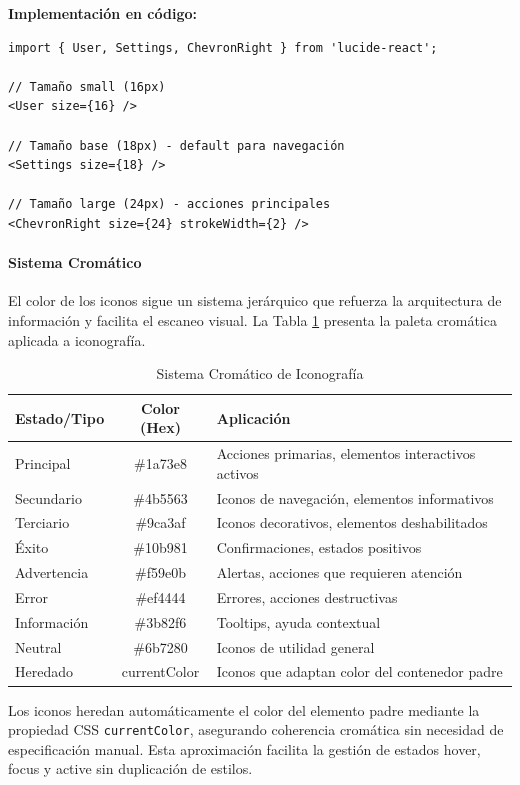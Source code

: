 \documentclass[12pt,a4paper,oneside]{article}
\begin{document}
\textbf{Implementación en código:}

\begin{verbatim}
import { User, Settings, ChevronRight } from 'lucide-react';

// Tamaño small (16px)
<User size={16} />

// Tamaño base (18px) - default para navegación
<Settings size={18} />

// Tamaño large (24px) - acciones principales
<ChevronRight size={24} strokeWidth={2} />
\end{verbatim}

\paragraph{Sistema Cromático}
El color de los iconos sigue un sistema jerárquico que refuerza la arquitectura de información y facilita el escaneo visual. La Tabla \ref{tab:iconos-colores} presenta la paleta cromática aplicada a iconografía.

\begin{table}[h]
\centering
\caption{Sistema Cromático de Iconografía}
\label{tab:iconos-colores}
\begin{tabular}{|l|c|p{6cm}|}
\hline
\textbf{Estado/Tipo} & \textbf{Color (Hex)} & \textbf{Aplicación} \\
\hline
Principal & \#1a73e8 & Acciones primarias, elementos interactivos activos \\
\hline
Secundario & \#4b5563 & Iconos de navegación, elementos informativos \\
\hline
Terciario & \#9ca3af & Iconos decorativos, elementos deshabilitados \\
\hline
Éxito & \#10b981 & Confirmaciones, estados positivos \\
\hline
Advertencia & \#f59e0b & Alertas, acciones que requieren atención \\
\hline
Error & \#ef4444 & Errores, acciones destructivas \\
\hline
Información & \#3b82f6 & Tooltips, ayuda contextual \\
\hline
Neutral & \#6b7280 & Iconos de utilidad general \\
\hline
Heredado & currentColor & Iconos que adaptan color del contenedor padre \\
\hline
\end{tabular}
\end{table}

Los iconos heredan automáticamente el color del elemento padre mediante la propiedad CSS \texttt{currentColor}, asegurando coherencia cromática sin necesidad de especificación manual. Esta aproximación facilita la gestión de estados hover, focus y active sin duplicación de estilos.
\end{document}
